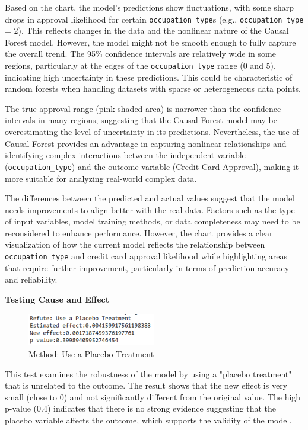 \documentclass[12pt]{report}
\begin{document}
    Based on the chart, the model's predictions show fluctuations, with some sharp drops in approval likelihood for certain \texttt{occupation\_type}s (e.g., \texttt{occupation\_type} = 2). This reflects changes in the data and the nonlinear nature of the Causal Forest model. However, the model might not be smooth enough to fully capture the overall trend. The 95\% confidence intervals are relatively wide in some regions, particularly at the edges of the \texttt{occupation\_type} range (0 and 5), indicating high uncertainty in these predictions. This could be characteristic of random forests when handling datasets with sparse or heterogeneous data points.

    The true approval range (pink shaded area) is narrower than the confidence intervals in many regions, suggesting that the Causal Forest model may be overestimating the level of uncertainty in its predictions. Nevertheless, the use of Causal Forest provides an advantage in capturing nonlinear relationships and identifying complex interactions between the independent variable (\texttt{occupation\_type}) and the outcome variable (Credit Card Approval), making it more suitable for analyzing real-world complex data.

    The differences between the predicted and actual values suggest that the model needs improvements to align better with the real data. Factors such as the type of input variables, model training methods, or data completeness may need to be reconsidered to enhance performance. However, the chart provides a clear visualization of how the current model reflects the relationship between \texttt{occupation\_type} and credit card approval likelihood while highlighting areas that require further improvement, particularly in terms of prediction accuracy and reliability.

    {\bfseries Testing Cause and Effect}

    \begin{figure}[h!]
        \centering
        \includegraphics[width=0.5\textwidth]{resources/pic/Testing Use Placebo Treatment.png}
        \caption{Method: Use a Placebo Treatment}
        \label{fig:Use a Placebo Treatment}
    \end{figure}

    This test examines the robustness of the model by using a "placebo treatment" that is unrelated to the outcome. The result shows that the new effect is very small (close to 0) and not significantly different from the original value. The high p-value (0.4) indicates that there is no strong evidence suggesting that the placebo variable affects the outcome, which supports the validity of the model.
\end{document}
